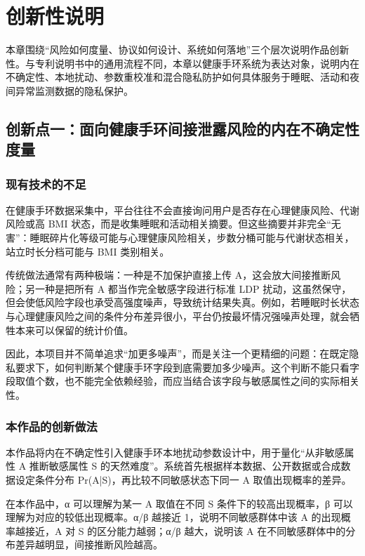 \documentclass{cumcmthesis}
\numberwithin{equation}{section}
\numberwithin{figure}{section}
\numberwithin{table}{section}
\begin{document}
\clearpage
\section{创新性说明}

本章围绕“风险如何度量、协议如何设计、系统如何落地”三个层次说明作品创新性。与专利说明书中的通用流程不同，本章以健康手环系统为表达对象，说明内在不确定性、本地扰动、参数重校准和混合隐私防护如何具体服务于睡眠、活动和夜间异常监测数据的隐私保护。

\subsection{创新点一：面向健康手环间接泄露风险的内在不确定性度量}

\subsubsection{现有技术的不足}

在健康手环数据采集中，平台往往不会直接询问用户是否存在心理健康风险、代谢风险或高 BMI 状态，而是收集睡眠和活动相关摘要。但这些摘要并非完全“无害”：睡眠碎片化等级可能与心理健康风险相关，步数分桶可能与代谢状态相关，站立时长分档可能与 BMI 类别相关。

传统做法通常有两种极端：一种是不加保护直接上传 A，这会放大间接推断风险；另一种是把所有 A 都当作完全敏感字段进行标准 LDP 扰动，这虽然保守，但会使低风险字段也承受高强度噪声，导致统计结果失真。例如，若睡眠时长状态与心理健康风险之间的条件分布差异很小，平台仍按最坏情况强噪声处理，就会牺牲本来可以保留的统计价值。

因此，本项目并不简单追求“加更多噪声”，而是关注一个更精细的问题：在既定隐私要求下，如何判断某个健康手环字段到底需要加多少噪声。这个判断不能只看字段取值个数，也不能完全依赖经验，而应当结合该字段与敏感属性之间的实际相关性。

\subsubsection{本作品的创新做法}

本作品将内在不确定性引入健康手环本地扰动参数设计中，用于量化“从非敏感属性 A 推断敏感属性 S 的天然难度”。系统首先根据样本数据、公开数据或合成数据设定条件分布 Pr(A|S)，再比较不同敏感状态下同一 A 取值出现概率的差异。

在本作品中，α 可以理解为某一 A 取值在不同 S 条件下的较高出现概率，β 可以理解为对应的较低出现概率。α/β 越接近 1，说明不同敏感群体中该 A 的出现概率越接近，A 对 S 的区分能力越弱；α/β 越大，说明该 A 在不同敏感群体中的分布差异越明显，间接推断风险越高。
\end{document}
